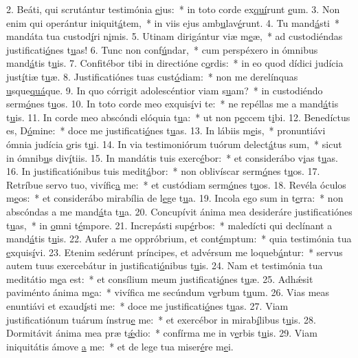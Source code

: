 2. Beáti, qui scrutántur testimónia \uline{e}jus:~* in toto corde ex\uline{quí}runt \uline{e}um.
3. Non enim qui operántur iniquit\uline{á}tem,~* in viis ejus amb\uline{u}lav\uline{é}runt.
4. Tu mand\uline{á}sti~* mandáta tua custod\uline{í}ri n\uline{i}mis.
5. Utinam dirigántur viæ m\uline{e}æ,~* ad custodiéndas justificati\uline{ó}nes t\uline{u}as!
6. Tunc non conf\uline{ú}ndar,~* cum perspéxero in ómnibus mand\uline{á}tis t\uline{u}is.
7. Confitébor tibi in directióne c\uline{o}rdis:~* in eo quod dídici judícia just\uline{í}tiæ t\uline{u}æ.
8. Justificatiónes tuas cust\uline{ó}diam:~* non me derelínquas \uline{u}sque\uline{quá}que.
9. In quo córrigit adolescéntior viam s\uline{u}am?~* in custodiéndo serm\uline{ó}nes t\uline{u}os.
10. In toto corde meo exquis\uline{í}vi te:~* ne repéllas me a mand\uline{á}tis t\uline{u}is.
11. In corde meo abscóndi elóquia t\uline{u}a:~* ut non p\uline{e}ccem t\uline{i}bi.
12. Benedíctus es, D\uline{ó}mine:~* doce me justificati\uline{ó}nes t\uline{u}as.
13. In lábiis m\uline{e}is,~* pronuntiávi ómnia judícia \uline{o}ris t\uline{u}i.
14. In via testimoniórum tuórum delect\uline{á}tus sum,~* sicut in ómnib\uline{u}s div\uline{í}tiis.
15. In mandátis tuis exerc\uline{é}bor:~* et considerábo v\uline{i}as t\uline{u}as.
16. In justificatiónibus tuis medit\uline{á}bor:~* non oblivíscar serm\uline{ó}nes t\uline{u}os.
17. Retríbue servo tuo, vivífic\uline{a} me:~* et custódiam serm\uline{ó}nes t\uline{u}os.
18. Revéla óculos m\uline{e}os:~* et considerábo mirabília de l\uline{e}ge t\uline{u}a.
19. Incola ego sum in t\uline{e}rra:~* non abscóndas a me mand\uline{á}ta t\uline{u}a.
20. Concupívit ánima mea desideráre justificatiónes t\uline{u}as,~* in \uline{o}mni t\uline{é}mpore.
21. Increpásti sup\uline{é}rbos:~* maledícti qui declínant a mand\uline{á}tis t\uline{u}is.
22. Aufer a me oppróbrium, et cont\uline{é}mptum:~* quia testimónia tua \uline{e}xquis\uline{í}vi.
23. Etenim sedérunt príncipes, et advérsum me loqueb\uline{á}ntur:~* servus autem tuus exercebátur in justificati\uline{ó}nibus t\uline{u}is.
24. Nam et testimónia tua meditátio m\uline{e}a est:~* et consílium meum justificati\uline{ó}nes t\uline{u}æ.
25. Adhǽsit paviménto ánima m\uline{e}a:~* vivífica me secúndum v\uline{e}rbum t\uline{u}um.
26. Vias meas enuntiávi et exaud\uline{í}sti me:~* doce me justificati\uline{ó}nes t\uline{u}as.
27. Viam justificatiónum tuárum ínstru\uline{e} me:~* et exercébor in mirab\uline{í}libus t\uline{u}is.
28. Dormitávit ánima mea præ t\uline{ǽ}dio:~* confírma me in v\uline{e}rbis t\uline{u}is.
29. Viam iniquitátis ámove \uline{a} me:~* et de lege tua miser\uline{é}re m\uline{e}i.
